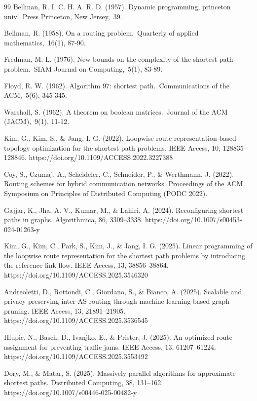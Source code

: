 \documentclass[10pt]{NSP1}
\begin{document}
\begin{thebibliography}{99}
Bellman, R. I. C. H. A. R. D. (1957). Dynamic programming, princeton univ. Press Princeton, New Jersey, 39.

Bellman, R. (1958). On a routing problem. Quarterly of applied mathematics, 16(1), 87-90.

Fredman, M. L. (1976). New bounds on the complexity of the shortest path problem. SIAM Journal on Computing, 5(1), 83-89.

Floyd, R. W. (1962). Algorithm 97: shortest path. Communications of the ACM, 5(6), 345-345.

Warshall, S. (1962). A theorem on boolean matrices. Journal of the ACM (JACM), 9(1), 11-12.

Kim, G., Kim, S., \& Jang, I. G. (2022). Loopwise route representation-based topology optimization for the shortest path problems. IEEE Access, 10, 128835–128846. https://doi.org/10.1109/ACCESS.2022.3227388

Coy, S., Czumaj, A., Scheideler, C., Schneider, P., \& Werthmann, J. (2022). Routing schemes for hybrid communication networks. Proceedings of the ACM Symposium on Principles of Distributed Computing (PODC 2022).

Gajjar, K., Jha, A. V., Kumar, M., \& Lahiri, A. (2024). Reconfiguring shortest paths in graphs. Algorithmica, 86, 3309–3338. https://doi.org/10.1007/s00453-024-01263-y

Kim, G., Kim, C., Park, S., Kim, J., \& Jang, I. G. (2025). Linear programming of the loopwise route representation for the shortest path problems by introducing the reference link flow. IEEE Access, 13, 38856–38864. https://doi.org/10.1109/ACCESS.2025.3546320

Andreoletti, D., Rottondi, C., Giordano, S., \& Bianco, A. (2025). Scalable and privacy-preserving inter-AS routing through machine-learning-based graph pruning. IEEE Access, 13, 21891–21905. https://doi.org/10.1109/ACCESS.2025.3536545

Hlupic, N., Basch, D., Ivanjko, E., \& Prister, J. (2025). An optimized route assignment for preventing traffic jams. IEEE Access, 13, 61207–61224. https://doi.org/10.1109/ACCESS.2025.3553492

Dory, M., \& Matar, S. (2025). Massively parallel algorithms for approximate shortest paths. Distributed Computing, 38, 131–162. https://doi.org/10.1007/s00446-025-00482-y

\end{thebibliography}
\end{document}
